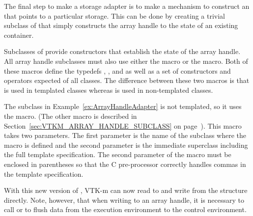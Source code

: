 The final step to make a storage adapter is to make a mechanism to
construct an  that points to a particular
storage. This can be done by creating a trivial subclass of
 that simply constructs the array handle to the state
of an existing container.


\label{sec:VTKM_ARRAY_HANDLE_SUBCLASS_NT}

Subclasses of  provide constructors that
establish the state of the array handle. All array handle subclasses must
also use either the  macro or the
 macro. Both of these macros
define the typedefs , , and
 as well as a set of constructors and operators
expected of all  classes. The difference
between these two macros is that 
is used in templated classes whereas
 is used in non-templated
classes.

The  subclass in
Example~\ref{ex:ArrayHandleAdapter} is not templated, so it uses
the  macro. (The other macro
is described in Section~\ref{sec:VTKM_ARRAY_HANDLE_SUBCLASS} on
page~\pageref{sec:VTKM_ARRAY_HANDLE_SUBCLASS}). This macro takes two
parameters. The first parameter is the name of the subclass where the macro
is defined and the second parameter is the immediate superclass including
the full template specification. The second parameter of the macro must be
enclosed in parentheses so that the C pre-processor correctly handles
commas in the template specification.

With this new version of , VTK-m can now read
to and write from the  structure directly. Note,
however, that when writing to an array handle, it is necessary to call
 or  to flush
data from the execution environment to the control environment. 



